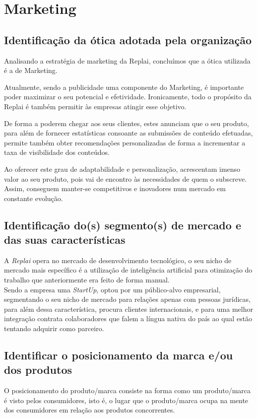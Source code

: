 \section{Marketing}

\subsection{Identificação da ótica adotada pela organização}

Analisando a estratégia de marketing da Replai, concluímos que a ótica utilizada é a de Marketing.

Atualmente, sendo a publicidade uma componente do Marketing, é importante poder maximizar o seu potencial e efetividade. Ironicamente, todo o propósito da Replai é também permitir às empresas atingir esse objetivo.
  
De forma a poderem chegar aos seus clientes, estes anunciam que o seu produto, para além de fornecer estatísticas consoante as submissões de conteúdo efetuadas, permite também obter recomendações personalizadas de forma a incrementar a taxa de visibilidade dos conteúdos.
  
Ao oferecer este grau de adaptabilidade e personalização, acrescentam imenso valor ao seu produto, pois vai de encontro às necessidades de quem o subscreve. Assim, conseguem manter-se competitivos e inovadores num mercado em constante evolução.\\

\newpage
\subsection{Identificação do(s) segmento(s) de mercado e das suas características}

A \textit{Replai} opera no mercado de desenvolvimento tecnológico, o seu nicho de mercado mais específico é a utilização de inteligência artificial para otimização do trabalho que anteriormente era feito de forma manual.\\

Sendo a empresa uma \textit{StartUp}, optou por um público-alvo empresarial, segmentando o seu nicho de mercado para relações apenas com pessoas jurídicas, para além dessa característica, procura clientes internacionais, e para uma melhor integração contrata colaboradores que falem a língua nativa do país ao qual estão tentando adquirir como parceiro.\\

\subsection{Identificar o posicionamento da marca e/ou dos produtos}
O posicionamento do produto/marca consiste na forma como um produto/marca é visto pelos consumidores, isto é, o lugar que o produto/marca ocupa na mente dos consumidores em relação aos produtos concorrentes.\\

